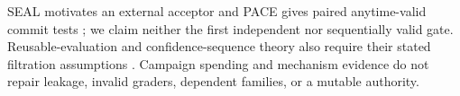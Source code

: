 SEAL motivates an external acceptor and PACE gives paired anytime-valid commit
tests \citep{guo2026seal,shawn2026pace}; we claim neither the first independent
nor sequentially valid gate.  Reusable-evaluation and confidence-sequence theory
also require their stated filtration assumptions
\citep{dwork2015reusable,howard2021confidence}.  Campaign spending and mechanism
evidence do not repair leakage, invalid graders, dependent families, or a mutable
authority.
